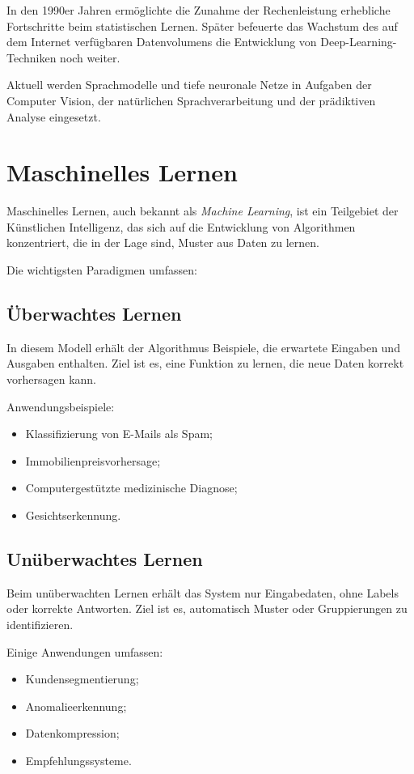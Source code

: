 \documentclass[11pt]{article}
\begin{document}
In den 1990er Jahren ermöglichte die Zunahme der Rechenleistung erhebliche Fortschritte beim
statistischen Lernen. Später befeuerte das Wachstum des auf dem Internet verfügbaren Datenvolumens
die Entwicklung von Deep-Learning-Techniken noch weiter.

Aktuell werden Sprachmodelle und tiefe neuronale Netze in Aufgaben der Computer Vision,
der natürlichen Sprachverarbeitung und der prädiktiven Analyse eingesetzt.
 

\section{Maschinelles Lernen}

Maschinelles Lernen, auch bekannt als \textit{Machine Learning}, ist ein Teilgebiet der
Künstlichen Intelligenz, das sich auf die Entwicklung von Algorithmen konzentriert, die in der Lage sind, Muster aus
Daten zu lernen.

Die wichtigsten Paradigmen umfassen: 

\subsection{Überwachtes Lernen}

In diesem Modell erhält der Algorithmus Beispiele, die erwartete Eingaben und Ausgaben enthalten. Ziel ist es,
eine Funktion zu lernen, die neue Daten korrekt vorhersagen kann.

Anwendungsbeispiele:

\begin{itemize}
    \item Klassifizierung von E-Mails als Spam;
    \item Immobilienpreisvorhersage;
    \item Computergestützte medizinische Diagnose;
    \item Gesichtserkennung.
\end{itemize}
 

\subsection{Unüberwachtes Lernen}

Beim unüberwachten Lernen erhält das System nur Eingabedaten, ohne Labels
oder korrekte Antworten. Ziel ist es, automatisch Muster oder Gruppierungen zu identifizieren.

Einige Anwendungen umfassen:

\begin{itemize}
    \item Kundensegmentierung;
    \item Anomalieerkennung;
    \item Datenkompression;
    \item Empfehlungssysteme.
\end{itemize} 
\end{document}
